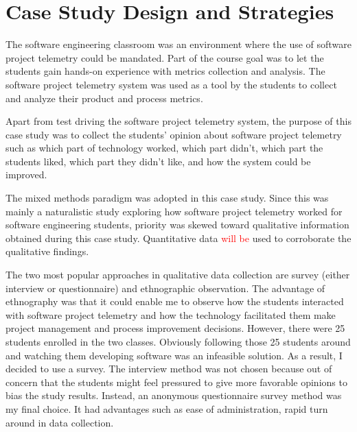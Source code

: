 
\section{Case Study Design and Strategies} \label{EvaluationInClassroom:Design}

The software engineering classroom was an environment where the use of software project telemetry could be mandated. Part of the course goal was to let the students gain hands-on experience with metrics collection and analysis. The software project telemetry system was used as a tool by the students to collect and analyze their product and process metrics.

Apart from test driving the software project telemetry system, the purpose of this case study was to collect the students' opinion about software project telemetry such as which part of technology worked, which part didn't, which part the students liked, which part they didn't like, and how the system could be improved.  

The mixed methods paradigm was adopted in this case study. Since this was mainly a naturalistic study exploring how software project telemetry worked for software engineering students, priority was skewed toward qualitative information obtained during this case study. Quantitative data \textcolor{red}{will be} used to corroborate the qualitative findings.

The two most popular approaches in qualitative data collection are survey (either interview or questionnaire) and ethnographic observation. The advantage of ethnography was that it could enable me to observe how the students interacted with software project telemetry and how the technology facilitated them make project management and process improvement decisions. However, there were 25 students enrolled in the two classes. Obviously following those 25 students around and watching them developing software was an infeasible solution. As a result, I decided to use a survey. The interview method was not chosen because out of concern that the students might feel pressured to give more favorable opinions to bias the study results. Instead, an anonymous questionnaire survey method was my final choice. It had advantages such as ease of administration, rapid turn around in data collection.


